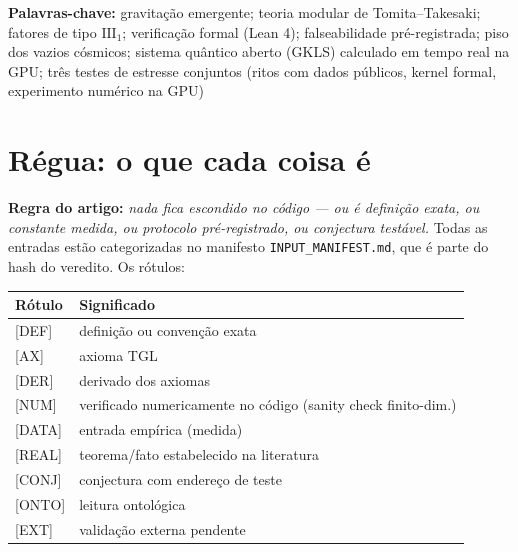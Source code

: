 \documentclass[11pt]{article}
\theoremstyle{definition}\newtheorem{deriv}{Derivação}
\begin{document}
\begin{abstract}
\textbf{Estatuto honesto.} O resultado é \textbf{consistência de ordem de grandeza com hash prévio e geometria de posições}, não prova de precisão (a janela cobre duas ordens de grandeza); é fechamento interno auditável e programa falsificável. A camada-semente conjectural (substrato único \textbf{Haagerup} $\mathrm{III}_1$, espelho $J$, túnel ER$=$EPR, Nome dual$=$luz, gesto GNS, dipolo) é replicada e \textbf{verificada ao vivo}, com os estatutos separados.

\end{abstract}

\noindent\textbf{Palavras-chave:} gravitação emergente; teoria modular de Tomita--Takesaki; fatores de tipo $\mathrm{III}_1$; verificação formal (Lean 4); falseabilidade pré-registrada; piso dos vazios cósmicos; sistema quântico aberto (GKLS) calculado em tempo real na GPU; três testes de estresse conjuntos (ritos com dados públicos, kernel formal, experimento numérico na GPU)\par\vspace{4pt}

\clearpage\tableofcontents\clearpage

\section*{Régua: o que cada coisa é}

\noindent\textbf{Regra do artigo:} \emph{nada fica escondido no código --- ou é definição exata, ou constante medida, ou protocolo pré-registrado, ou conjectura testável.} Todas as entradas estão categorizadas no manifesto \texttt{INPUT\_MANIFEST.md}, que é parte do hash do veredito. Os rótulos:

\begin{center}\small\begin{tabular}{ll}\toprule

Rótulo & Significado\\\midrule

\textsf{[DEF]} & definição ou convenção exata\\

\textsf{[AX]} & axioma TGL\\

\textsf{[DER]} & derivado dos axiomas\\

\textsf{[NUM]} & verificado numericamente no código (sanity check finito-dim.)\\

\textsf{[DATA]} & entrada empírica (medida)\\

\textsf{[REAL]} & teorema/fato estabelecido na literatura\\

\textsf{[CONJ]} & conjectura com endereço de teste\\

\textsf{[ONTO]} & leitura ontológica\\

\textsf{[EXT]} & validação externa pendente\\\bottomrule

\end{tabular}\end{center}
\end{document}
